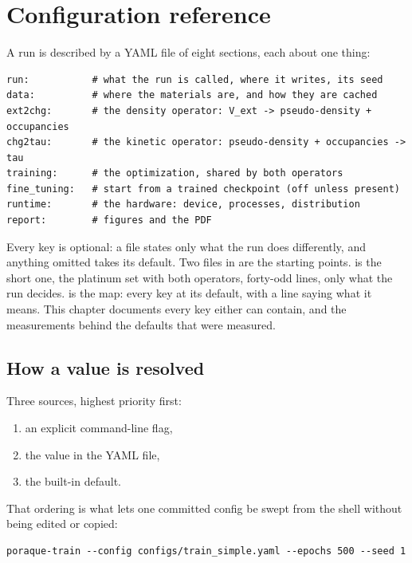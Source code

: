 \chapter{Configuration reference}
\label{ch:config}

A run is described by a YAML file of eight sections, each about one thing:

\begin{lstlisting}
run:           # what the run is called, where it writes, its seed
data:          # where the materials are, and how they are cached
ext2chg:       # the density operator: V_ext -> pseudo-density + occupancies
chg2tau:       # the kinetic operator: pseudo-density + occupancies -> tau
training:      # the optimization, shared by both operators
fine_tuning:   # start from a trained checkpoint (off unless present)
runtime:       # the hardware: device, processes, distribution
report:        # figures and the PDF
\end{lstlisting}

Every key is optional: a file states only what the run does differently, and anything omitted takes its default. Two files in  are the starting points.  is the short one, the platinum set with both operators, forty-odd lines, only what the run decides.  is the map: every key at its default, with a line saying what it means. This chapter documents every key either can contain, and the measurements behind the defaults that were measured.

\section{How a value is resolved}

Three sources, highest priority first:

\begin{enumerate}
  \item an explicit command-line flag,
  \item the value in the YAML file,
  \item the built-in default.
\end{enumerate}

That ordering is what lets one committed config be swept from the shell without being edited or copied:

\begin{lstlisting}
poraque-train --config configs/train_simple.yaml --epochs 500 --seed 1
\end{lstlisting}

